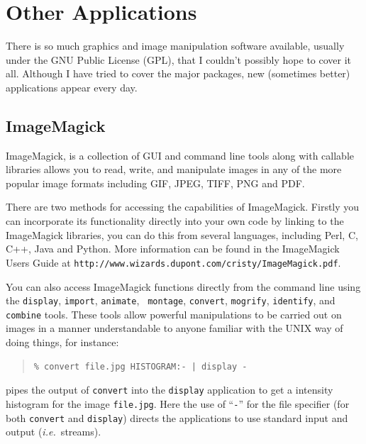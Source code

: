 \documentclass[twoside,11pt]{article}
\newcommand{\htmladdnormallink}[2]{#1}
\newcommand{\latex}[1]{#1}
\newcommand{\xlabel}[1]{}
\begin{document}
\section{\xlabel{sc15_applications}Other Applications\label{sc15_applications}}

There is so much graphics and image manipulation software available,
usually under the \htmladdnormallink{GNU Public
License}{http://www.gnu.org/copyleft/gpl.html} (GPL), that I couldn't
possibly hope to cover it all. Although I have tried to cover the
major packages, new (sometimes better) applications appear every day. 

\subsection{\xlabel{sc15_magick}ImageMagick\label{sc15_magick}}

\htmladdnormallink{ImageMagick}{http://www.wizards.dupont.com/cristy/ImageMagick.html},
is a collection of GUI and command line tools along with callable
libraries allows you to read, write, and manipulate images in any of
the more popular image formats including GIF, JPEG, TIFF, PNG and PDF.


There are two methods for accessing the capabilities of ImageMagick.
Firstly you can incorporate its functionality directly into your own
code by linking to the ImageMagick libraries, you can do this from
several languages, including Perl, C, C++, Java and Python. More
information can be found in the \htmladdnormallink{ImageMagick Users
Guide}{http://www.wizards.dupont.com/cristy/ImageMagick.pdf} \latex{at
{\tt http://www.wizards.dupont.com/cristy/ImageMagick.pdf}}.

You can also access ImageMagick functions directly from the command
line using the {\tt display}, {\tt import}, {\tt animate}, {\tt
montage}, {\tt convert}, {\tt mogrify}, {\tt identify}, and {\tt
combine} tools. These tools allow powerful manipulations to be carried
out on images in a manner understandable to anyone familiar with the
UNIX way of doing things, for instance:

\small
\begin{quote}
\begin{verbatim}
% convert file.jpg HISTOGRAM:- | display -
\end{verbatim}
\end{quote}
\normalsize

pipes the output of {\tt convert} into the {\tt display} application
to get a intensity histogram for the image {\tt file.jpg}. Here the
use of ``\verb+-+'' for the file specifier (for both {\tt convert} and
{\tt display}) directs the applications to use standard input and
output ({\em i.e.\ }streams).
    
\end{document}
